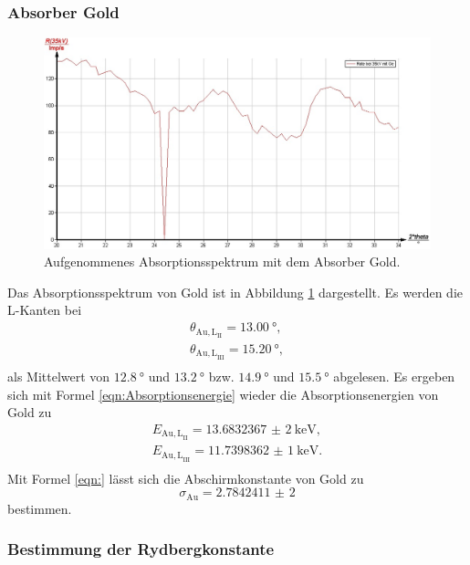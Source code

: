 \subsubsection{Absorber Gold}
\begin{figure}
	\includegraphics[width=1.0\textwidth]{nIKO_und_jULIAN_ÜLADS/gold.jpg}
	\caption{Aufgenommenes Absorptionsspektrum mit dem Absorber Gold.}
	\label{fig:gold_absorber}
\end{figure}
Das Absorptionsspektrum von Gold ist in Abbildung \ref{fig:gold_absorber} dargestellt.
Es werden die L-Kanten bei
\begin{gather*}
	\theta_{\mathrm{Au,L}_{\mathrm{II}}} = \SI{13,00}{\degree} \mathrm{,} \\
	\theta_{\mathrm{Au,L}_{\mathrm{III}}} = \SI{15,20}{\degree} \mathrm{,} \\
\end{gather*}
als Mittelwert von $\SI{12,8}{\degree}$ und $\SI{13,2}{\degree}$ bzw. $\SI{14,9}{\degree}$
und $\SI{15,5}{\degree}$ abgelesen.
Es ergeben sich mit Formel \eqref{eqn:Absorptionsenergie} wieder die Absorptionsenergien von
Gold zu
\begin{gather*}
	E_{\mathrm{Au,L}_{\mathrm{II}}} = \SI{13,6832367(2)}{\kilo\electronvolt} \mathrm{,} \\
	E_{\mathrm{Au,L}_{\mathrm{III}}} = \SI{11,7398362(1)}{\kilo\electronvolt} \mathrm{.} \\
\end{gather*}
Mit Formel \eqref{eqn:} lässt sich die Abschirmkonstante von Gold zu 
\begin{equation*}
	\sigma_{\mathrm{Au}} = \num{2,7842411(2)}
\end{equation*}
bestimmen.

\subsubsection{Bestimmung der Rydbergkonstante}

